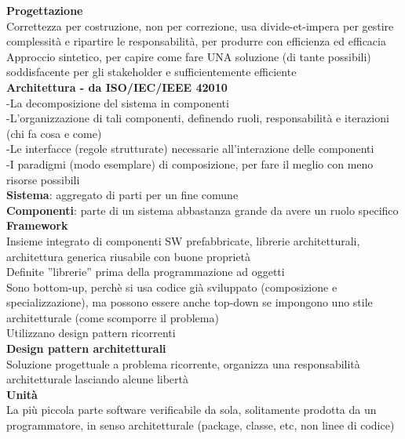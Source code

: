 \documentclass{article}
\begin{document}
		\textbf{Progettazione}\\
		Correttezza per costruzione, non per correzione, usa divide-et-impera per gestire complessità e ripartire le responsabilità, per produrre con efficienza ed efficacia\\
		Approccio sintetico, per capire come fare UNA soluzione (di tante possibili) soddisfacente per gli stakeholder e sufficientemente efficiente\\
		
		\textbf{Architettura - da ISO/IEC/IEEE 42010}\\
		-La decomposizione del sistema in componenti\\
		-L'organizzazione di tali componenti, definendo ruoli, responsabilità e iterazioni (chi fa cosa e come)\\
		-Le interfacce (regole strutturate) necessarie all'interazione delle componenti\\
		-I paradigmi (modo esemplare) di composizione, per fare il meglio con meno risorse possibili\\
		
		\textbf{Sistema}: aggregato di parti per un fine comune\\
		
		\textbf{Componenti}: parte di un sistema abbastanza grande da avere un ruolo specifico\\
		
		\textbf{Framework}\\
		Insieme integrato di componenti SW prefabbricate, librerie architetturali, architettura generica riusabile con buone proprietà\\
		Definite ''librerie'' prima della programmazione ad oggetti\\
		Sono bottom-up, perchè si usa codice già sviluppato (composizione e specializzazione), ma possono essere anche top-down se impongono uno stile architetturale (come scomporre il problema)\\
		Utilizzano design pattern ricorrenti\\
		
		\textbf{Design pattern architetturali}\\
		Soluzione progettuale a problema ricorrente, organizza una responsabilità architetturale lasciando alcune libertà\\
		
		\textbf{Unità}\\
		La più piccola parte software verificabile da sola, solitamente prodotta da un programmatore, in senso architetturale (package, classe, etc, non linee di codice)\\
		
\end{document}
